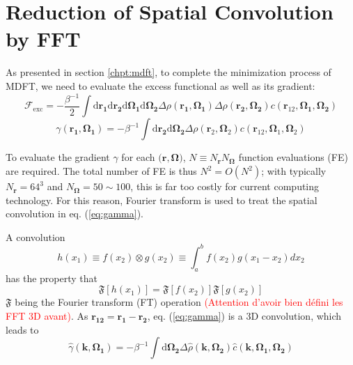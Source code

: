
\chapter{Reduction of Spatial Convolution by FFT\label{chpt:fft-spatial}}

As presented in section \ref{chpt:mdft}, to complete the minimization
process of MDFT, we need to evaluate the excess functional as well
as its gradient:
\begin{equation}
\mathcal{F}_{\mathrm{exc}}=-\frac{\beta^{-1}}{2}\int\mathrm{d}\mathbf{r_{1}}\mathrm{d}\mathbf{r_{2}}\mathrm{d}\mathbf{\Omega_{1}}\mathrm{d}\mathbf{\Omega_{2}}\Delta\rho(\mathbf{r_{1}},\mathbf{\Omega_{1}})\Delta\rho(\mathbf{r_{2}},\mathbf{\Omega_{2}})c(\mathbf{r}_{12},\mathbf{\Omega_{1}},\mathbf{\Omega_{2}})\label{eq:fexc}
\end{equation}
\begin{equation}
\gamma(\mathbf{r_{1}},\mathbf{\Omega_{1}})=-\beta^{-1}\int\mathrm{d}\mathbf{r_{2}}\mathrm{d}\mathbf{\Omega_{2}}\Delta\rho(\mathbf{r}_{2},\mathbf{\Omega}_{2})c(\mathbf{r}_{12},\mathbf{\Omega}_{1},\mathbf{\Omega}_{2})\label{eq:gamma}
\end{equation}


To evaluate the gradient $\gamma$ for each $\mathbf{(r},\mathbf{\Omega})$,
$N\equiv N_{\mathbf{r}}N_{\mathbf{\Omega}}$ function evaluations
(FE) are required. The total number of FE is thus $N^{2}=O(N^{2})$; with typically $N_{\mathbf{r}}=64^{3}$ and $N_{\mathbf{\Omega}}=50\sim100$,
this is far too costly for current computing technology. For this reason, Fourier
transform is used to treat the spatial convolution in eq. (\ref{eq:gamma}).

A convolution
\begin{equation}
h(x_{1})\equiv f(x_{2})\otimes g(x_{2})\equiv\int_{a}^{b}f(x_{2})g(x_{1}-x_{2})dx_{2}\label{eq:convolution-1}
\end{equation}
has the property that
\begin{equation}
\mathfrak{F}[h(x_{1})]=\mathfrak{F}[f(x_{2})]\mathfrak{F}[g(x_{2})]\label{eq:convolution-2}
\end{equation}
$\mathfrak{F}$ being the Fourier transform (FT) operation \textcolor{red}{(Attention
d'avoir bien défini les FFT 3D avant)}. As $\mathbf{r_{12}}=\mathbf{r_{1}}-\mathbf{r_{2}}$,
eq. (\ref{eq:gamma}) is a 3D convolution, which leads to 
\begin{equation}
\hat{\gamma}(\mathbf{k},\mathbf{\Omega_{1}})=-\beta^{-1}\int\mathrm{d}\mathbf{\Omega_{2}}\Delta\hat{\rho}(\mathbf{k},\mathbf{\Omega_{2}})\hat{c}(\mathbf{k},\mathbf{\Omega_{1}},\mathbf{\Omega_{2}})\label{eq:gamma-k}
\end{equation}


